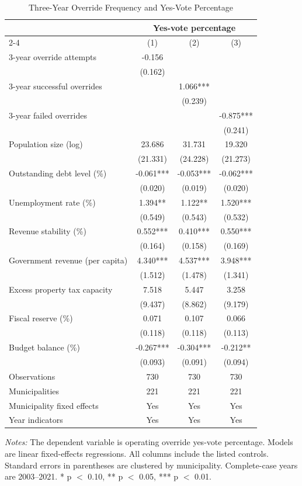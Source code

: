 \begin{table}[!htbp]
\centering
\caption{Three-Year Override Frequency and Yes-Vote Percentage}
\label{tab:northeast_vote_share_cumulative}
\small
\begin{tabular}{lccc}
\toprule
 & \multicolumn{3}{c}{Yes-vote percentage} \\
\cmidrule(lr){2-4}
 & (1) & (2) & (3) \\
\midrule
3-year override attempts & -0.156 &  &  \\
 & (0.162) &  &  \\
3-year successful overrides &  & 1.066*** &  \\
 &  & (0.239) &  \\
3-year failed overrides &  &  & -0.875*** \\
 &  &  & (0.241) \\
Population size (log) & 23.686 & 31.731 & 19.320 \\
 & (21.331) & (24.228) & (21.273) \\
Outstanding debt level (\%) & -0.061*** & -0.053*** & -0.062*** \\
 & (0.020) & (0.019) & (0.020) \\
Unemployment rate (\%) & 1.394** & 1.122** & 1.520*** \\
 & (0.549) & (0.543) & (0.532) \\
Revenue stability (\%) & 0.552*** & 0.410*** & 0.550*** \\
 & (0.164) & (0.158) & (0.169) \\
Government revenue (per capita) & 4.340*** & 4.537*** & 3.948*** \\
 & (1.512) & (1.478) & (1.341) \\
Excess property tax capacity & 7.518 & 5.447 & 3.258 \\
 & (9.437) & (8.862) & (9.179) \\
Fiscal reserve (\%) & 0.071 & 0.107 & 0.066 \\
 & (0.118) & (0.118) & (0.113) \\
Budget balance (\%) & -0.267*** & -0.304*** & -0.212** \\
 & (0.093) & (0.091) & (0.094) \\
\midrule
Observations & 730 & 730 & 730 \\
Municipalities & 221 & 221 & 221 \\
Municipality fixed effects & Yes & Yes & Yes \\
Year indicators & Yes & Yes & Yes \\
\bottomrule
\end{tabular}
\vspace{0.05in}
\begin{minipage}{0.96\textwidth}\footnotesize\emph{Notes:} The dependent variable is operating override yes-vote percentage. Models are linear fixed-effects regressions. All columns include the listed controls. Standard errors in parentheses are clustered by municipality. Complete-case years are 2003--2021. * p $<$ 0.10, ** p $<$ 0.05, *** p $<$ 0.01.\end{minipage}
\end{table}
